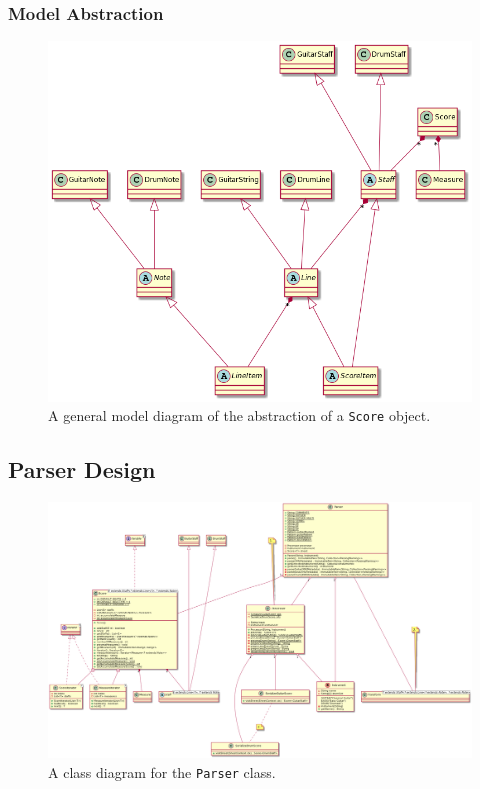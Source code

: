 \documentclass[11pt]{article}
\begin{document}
\subsubsection{Model Abstraction}
\label{sec:org986fd55}
\begin{figure}[htbp]
\centering
\includegraphics[width=.9\linewidth]{./Diagrams/backend-model-abstraction.png}
\caption{A general model diagram of the abstraction of a \texttt{Score} object.}
\end{figure}

\newpage

\subsection{Parser Design}
\label{sec:org258124a}
\begin{figure}[htbp]
\centering
\includegraphics[width=.9\linewidth]{./Diagrams/backend-parser-class-diagram.png}
\caption{A class diagram for the \texttt{Parser} class.}
\end{figure}
\end{document}

